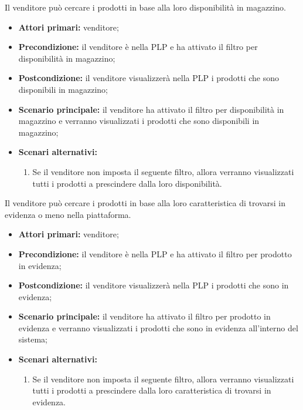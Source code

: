 Il venditore può cercare i prodotti in base alla loro disponibilità in magazzino.
\begin{itemize}
	\item \textbf{Attori primari:} venditore;
	\item \textbf{Precondizione:} il venditore è nella PLP e ha attivato il filtro per disponibilità in magazzino;
	\item \textbf{Postcondizione:} il venditore visualizzerà nella PLP i prodotti che sono disponibili in magazzino;
	\item \textbf{Scenario principale:} il venditore ha attivato il filtro per disponibilità in magazzino e verranno visualizzati i prodotti che sono disponibili in magazzino;
	\item \textbf{Scenari alternativi:}
	\begin{enumerate}[label=\lett]
		\item Se il venditore non imposta il seguente filtro, allora verranno visualizzati tutti i prodotti a prescindere dalla loro disponibilità.
	\end{enumerate}
\end{itemize}

Il venditore può cercare i prodotti in base alla loro caratteristica di trovarsi in evidenza o meno nella piattaforma.
\begin{itemize}
	\item \textbf{Attori primari:} venditore;
	\item \textbf{Precondizione:} il venditore è nella PLP e ha attivato il filtro per prodotto in evidenza;
	\item \textbf{Postcondizione:} il venditore visualizzerà nella PLP i prodotti che sono in evidenza;
	\item \textbf{Scenario principale:} il venditore ha attivato il filtro per prodotto in evidenza e verranno visualizzati i prodotti che sono in evidenza all'interno del sistema;
	\item \textbf{Scenari alternativi:}
	\begin{enumerate}[label=\lett]
		\item Se il venditore non imposta il seguente filtro, allora verranno visualizzati tutti i prodotti a prescindere dalla loro caratteristica di trovarsi in evidenza.
	\end{enumerate}
\end{itemize}